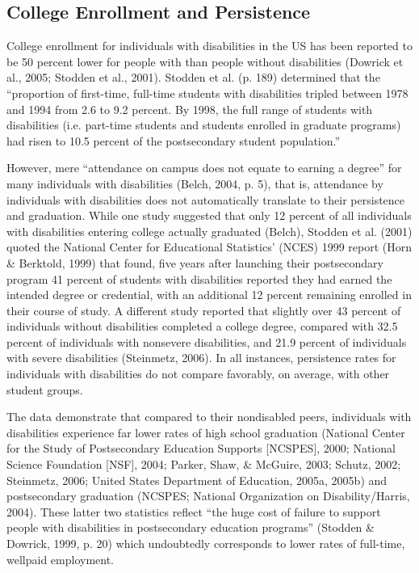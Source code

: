 \documentclass[11.5pt]{sig-alternate} %
\begin{document}
\begin{large}
\subsection*{College Enrollment and Persistence}
College enrollment for individuals with disabilities in the US has been reported to be 50 percent lower for people with than people without disabilities (Dowrick et al., 2005; Stodden et al., 2001). Stodden et al. (p. 189) determined that the “proportion of first-time, full-time students with disabilities tripled between 1978 and 1994 from 2.6 to 9.2 percent. By 1998, the full range of students with disabilities (i.e. part-time students and students enrolled in graduate programs) had risen to 10.5 percent of the postsecondary student population.” 

However, mere “attendance on campus does not equate to earning a degree” for many individuals with disabilities (Belch, 2004, p. 5), that is, attendance by individuals with disabilities does not automatically translate to their persistence and graduation. While one study suggested that only 12 percent of all individuals with disabilities entering college actually graduated (Belch), Stodden et al. (2001) quoted the National Center for Educational Statistics' (NCES) 1999 report (Horn \& Berktold, 1999) that found, five years after launching their postsecondary program 41 percent of students with disabilities reported they had earned the intended degree or credential, with an additional 12 percent remaining enrolled in their course of study. A different study reported that slightly over 43 percent of individuals without disabilities completed a college degree, compared with 32.5 percent of individuals with nonsevere disabilities, and 21.9 percent of individuals with severe disabilities (Steinmetz, 2006). In all instances, persistence rates for individuals with disabilities do not compare favorably, on average, with other student groups.

The data demonstrate that compared to their nondisabled peers, individuals with disabilities experience far lower rates of high school graduation (National Center for the Study of Postsecondary Education Supports [NCSPES], 2000; National Science Foundation [NSF], 2004; Parker, Shaw, \& McGuire, 2003; Schutz, 2002; Steinmetz, 2006; United States Department of Education, 2005a, 2005b) and postsecondary graduation (NCSPES; National Organization on Disability/Harris, 2004). These latter two statistics reflect “the huge cost of failure to support people with disabilities in postsecondary education programs” (Stodden \& Dowrick, 1999, p. 20) which undoubtedly corresponds to lower rates of full-time, wellpaid employment.


\end{large}
\end{document}
